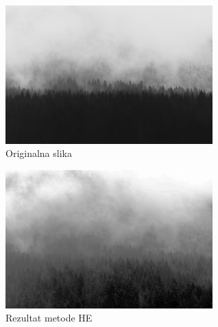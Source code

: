 \documentclass[12pt,a4paper]{article}
\theoremstyle{definition}
\theoremstyle{remark}
\theoremstyle{plain}
\begin{document}
\begin{multicols}{2}
\begin{figure}[H]
\centering
\includegraphics[width=8cm]{images/wood.jpeg}
  \caption{Originalna slika}\label{river}
\end{figure}
\columnbreak
\begin{figure}[H]
\centering
\includegraphics[width=8cm]{images/global_HE_1.jpg}
  \caption{Rezultat metode HE}\label{wood1_output}
\end{figure}
\end{multicols}
\end{document}
